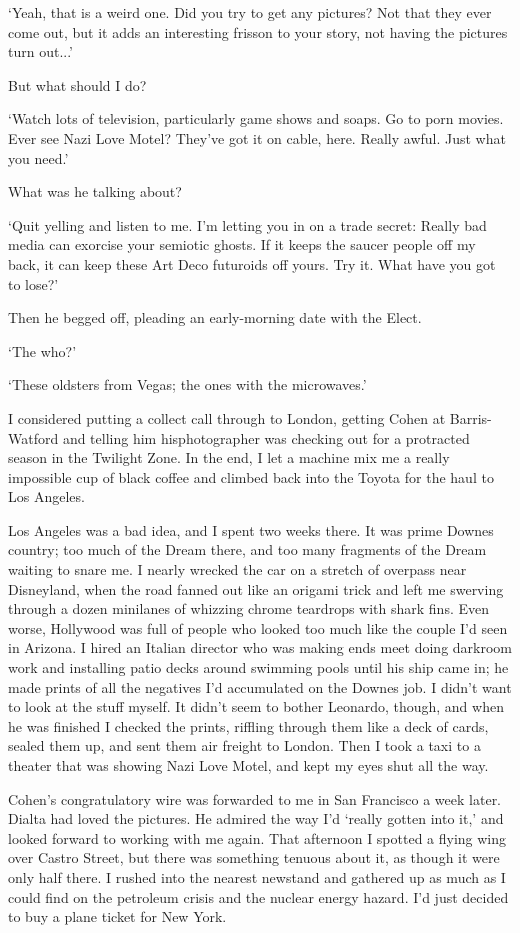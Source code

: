 `Yeah, that is a weird one. Did you try to get any pictures? Not that they ever come out, but it adds an interesting frisson to your story, not having the pictures turn out...'

But what should I do?

`Watch lots of television, particularly game shows and soaps. Go to porn movies. Ever see Nazi Love Motel? They've got it on cable, here. Really awful. Just what you need.'

What was he talking about?

`Quit yelling and listen to me. I'm letting you in on a trade secret: Really bad media can exorcise your semiotic ghosts. If it keeps the saucer people off my back, it can keep these Art Deco futuroids off yours. Try it. What have you got to lose?'

Then he begged off, pleading an early-morning date with the Elect.

`The who?'

`These oldsters from Vegas; the ones with the microwaves.'

I considered putting a collect call through to London, getting Cohen at Barris-Watford and telling him hisphotographer was checking out for a protracted season in the Twilight Zone. In the end, I let a machine mix me a really impossible cup of black coffee and climbed back into the Toyota for the haul to Los Angeles.

Los Angeles was a bad idea, and I spent two weeks there. It was prime Downes country; too much of the Dream there, and too many fragments of the Dream waiting to snare me. I nearly wrecked the car on a stretch of overpass near Disneyland, when the road fanned out like an origami trick and left me swerving through a dozen minilanes of whizzing chrome teardrops with shark fins. Even worse, Hollywood was full of people who looked too much like the couple I'd seen in Arizona. I hired an Italian director who was making ends meet doing darkroom work and installing patio decks around swimming pools until his ship came in; he made prints of all the negatives I'd accumulated on the Downes job. I didn't want to look at the stuff myself. It didn't seem to bother Leonardo, though, and when he was finished I checked the prints, riffling through them like a deck of cards, sealed them up, and sent them air freight to London. Then I took a taxi to a theater that was showing Nazi Love Motel, and kept my eyes shut all the way.

Cohen's congratulatory wire was forwarded to me in San Francisco a week later. Dialta had loved the pictures. He admired the way I'd `really gotten into it,' and looked forward to working with me again. That afternoon I spotted a flying wing over Castro Street, but there was something tenuous about it, as though it were only half there. I rushed into the nearest newstand and gathered up as much as I could find on the petroleum crisis and the nuclear energy hazard. I'd just decided to buy a plane ticket for New York.

